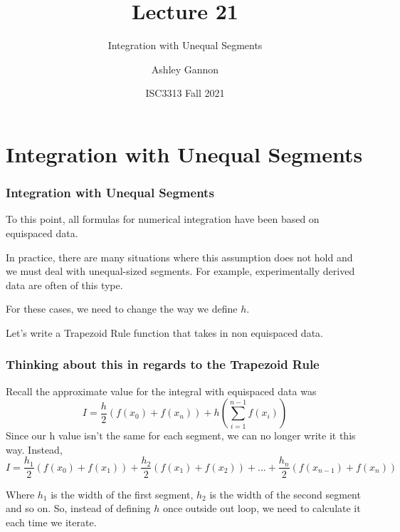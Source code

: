\documentclass{if-beamer}
\title[Lecture 21]{Lecture 21}
\subtitle{Integration with Unequal Segments}
\author{Ashley Gannon}
\date{ISC3313 Fall 2021}
\begin{document}
\begin{frame}
  \titlepage
\end{frame}
\section{Integration with Unequal Segments}
\begin{frame}
\frametitle{Integration with Unequal Segments}
To this point, all formulas for numerical integration have been based on equispaced data.\\\vspace{10pt}

In practice, there are many situations where this assumption does not hold and we must deal with unequal-sized segments. For example, experimentally derived data are often of this type. \\\vspace{10pt}

For these cases, we need to change the way we define $h$. \\\vspace{10pt}

Let's write a Trapezoid Rule function that takes in non equispaced data.
\end{frame}

\begin{frame}
\frametitle{Thinking about this in regards to the Trapezoid Rule}
Recall the approximate value for the integral with equispaced data was
$$I = \frac{h}{2}(f(x_0)+f(x_n))+h\left( \sum_{i = 1}^{n-1}f(x_i)\right)$$
Since our h value isn't the same for each segment, we can no longer write it this way. Instead, 
$$I = \frac{h_1}{2}(f(x_0)+f(x_1)) + \frac{h_2}{2}(f(x_1)+f(x_2))
+...+ \frac{h_n}{2}(f(x_{n-1})+f(x_n))$$

Where $h_1$ is the width of the first segment, $h_2$ is the width of the second segment and so on. So, instead of defining $h$ once outside out loop, we need to calculate it each time we iterate. 
\end{frame}
\end{document}
